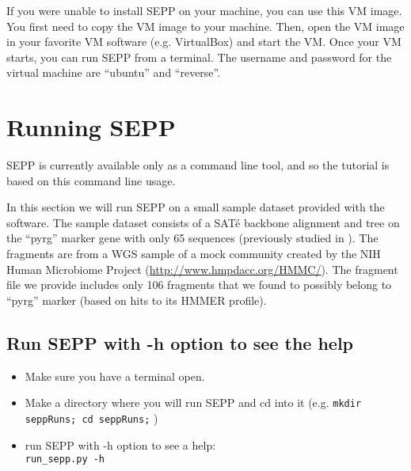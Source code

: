 \documentclass[11pt]{article} %
\newcommand{\sepp}{SEPP\xspace}
\newcommand{\ins}[1]{{\tt #1}}
\newcommand{\sate}{SAT\'{e}\xspace}
\begin{document}
If you were unable to install \sepp on your machine, you can use this VM image. You first need to copy the VM image to your machine. Then, open the VM image in your favorite VM software (e.g. VirtualBox) and start the VM. Once your VM starts, you can run \sepp from a terminal. The username and password for the virtual machine are ``ubuntu'' and ``reverse''.

\section{Running \sepp}
\sepp is currently available only as a command line tool, and
so the tutorial is based on this command line usage.

In this section we will run \sepp on a small sample dataset provided with the software. 
The sample dataset consists of a \sate backbone alignment and tree on the ``pyrg'' marker gene with only 65 sequences
(previously studied in \cite{metaphyler}). 
The fragments are from a WGS sample of a mock community created by the NIH Human Microbiome Project (\url{http://www.hmpdacc.org/HMMC/}).
The fragment file we provide includes only 106 fragments that we found to possibly belong to ``pyrg'' marker (based on hits to its HMMER profile).



\subsection{Run \sepp with -h option to see the help }

\begin{itemize}
\item Make sure you have a terminal open.
\item Make a directory where you will run \sepp and cd into it (e.g. \ins{mkdir seppRuns; cd seppRuns;} )
\item run \sepp with -h option to see a help:\\

\ins{run\_sepp.py -h}
\end{itemize}
\end{document}
